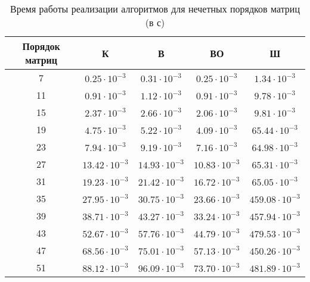 \begin{table}[h]
	\begin{center}
		\begin{threeparttable}
			\captionsetup{justification=raggedright,singlelinecheck=off}
			\caption{Время работы реализации алгоритмов для нечетных порядков матриц (в с)}
			\label{tbl:time_measurements_odd}
			\begin{tabular}{|c|c|c|c|c|}
				\hline
				Порядок матриц & К & В & ВО & Ш \\
				\hline
				7 &$ 0.25\cdot 10^{-3} $&$ 0.31\cdot 10^{-3} $&$ 0.25\cdot 10^{-3} $&$ 1.34\cdot 10^{-3}$\\
				\hline
				11 &$ 0.91\cdot 10^{-3} $&$ 1.12\cdot 10^{-3} $&$ 0.91\cdot 10^{-3} $&$ 9.78\cdot 10^{-3}$\\
				\hline
				15 &$ 2.37\cdot 10^{-3} $&$ 2.66\cdot 10^{-3} $&$ 2.06\cdot 10^{-3} $&$ 9.81\cdot 10^{-3}$\\
				\hline
				19 &$ 4.75\cdot 10^{-3} $&$ 5.22\cdot 10^{-3} $&$ 4.09\cdot 10^{-3} $&$ 65.44\cdot 10^{-3}$\\
				\hline
				23 &$ 7.94\cdot 10^{-3} $&$ 9.19\cdot 10^{-3} $&$ 7.16\cdot 10^{-3} $&$ 64.98\cdot 10^{-3}$\\
				\hline
				27 &$ 13.42\cdot 10^{-3} $&$ 14.93\cdot 10^{-3} $&$ 10.83\cdot 10^{-3} $&$ 65.31\cdot 10^{-3}$\\
				\hline
				31 &$ 19.23\cdot 10^{-3} $&$ 21.42\cdot 10^{-3} $&$ 16.72\cdot 10^{-3} $&$ 65.05\cdot 10^{-3}$\\
				\hline
				35 &$ 27.95\cdot 10^{-3} $&$ 30.75\cdot 10^{-3} $&$ 23.66\cdot 10^{-3} $&$ 459.08\cdot 10^{-3}$\\
				\hline
				39 &$ 38.71\cdot 10^{-3} $&$ 43.27\cdot 10^{-3} $&$ 33.24\cdot 10^{-3} $&$ 457.94\cdot 10^{-3}$\\
				\hline
				43 &$ 52.67\cdot 10^{-3} $&$ 57.76\cdot 10^{-3} $&$ 44.79\cdot 10^{-3} $&$ 479.53\cdot 10^{-3}$\\
				\hline
				47 &$ 68.56\cdot 10^{-3} $&$ 75.01\cdot 10^{-3} $&$ 57.13\cdot 10^{-3} $&$ 450.26\cdot 10^{-3}$\\
				\hline
				51 &$ 88.12\cdot 10^{-3} $&$ 96.09\cdot 10^{-3} $&$ 73.70\cdot 10^{-3} $&$ 481.89\cdot 10^{-3}$\\
			\hline
			\end{tabular}
		\end{threeparttable}
	\end{center}
\end{table}


